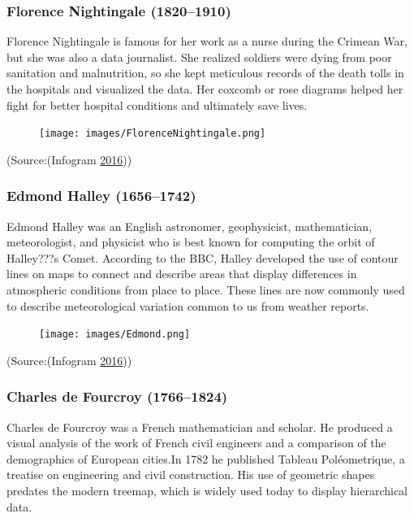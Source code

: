 \documentclass[]{book}
\begin{document}
\subsubsection{Florence Nightingale
(1820--1910)}\label{florence-nightingale-18201910}

Florence Nightingale is famous for her work as a nurse during the
Crimean War, but she was also a data journalist. She realized soldiers
were dying from poor sanitation and malnutrition, so she kept meticulous
records of the death tolls in the hospitals and visualized the data. Her
coxcomb or rose diagrams helped her fight for better hospital conditions
and ultimately save lives.

\begin{figure}
\centering
\texttt{[image: images/FlorenceNightingale.png]}
\caption{}
\end{figure}

(Source:(Infogram \protect\hyperlink{ref-history_viz}{2016}))

\subsubsection{Edmond Halley (1656--1742)}\label{edmond-halley-16561742}

Edmond Halley was an English astronomer, geophysicist, mathematician,
meteorologist, and physicist who is best known for computing the orbit
of Halley???s Comet. According to the BBC, Halley developed the use of
contour lines on maps to connect and describe areas that display
differences in atmospheric conditions from place to place. These lines
are now commonly used to describe meteorological variation common to us
from weather reports.

\begin{figure}
\centering
\texttt{[image: images/Edmond.png]}
\caption{}
\end{figure}

(Source:(Infogram \protect\hyperlink{ref-history_viz}{2016}))

\subsubsection{Charles de Fourcroy
(1766--1824)}\label{charles-de-fourcroy-17661824}

Charles de Fourcroy was a French mathematician and scholar. He produced
a visual analysis of the work of French civil engineers and a comparison
of the demographics of European cities.In 1782 he published Tableau
Poléometrique, a treatise on engineering and civil construction. His use
of geometric shapes predates the modern treemap, which is widely used
today to display hierarchical data.
\end{document}
